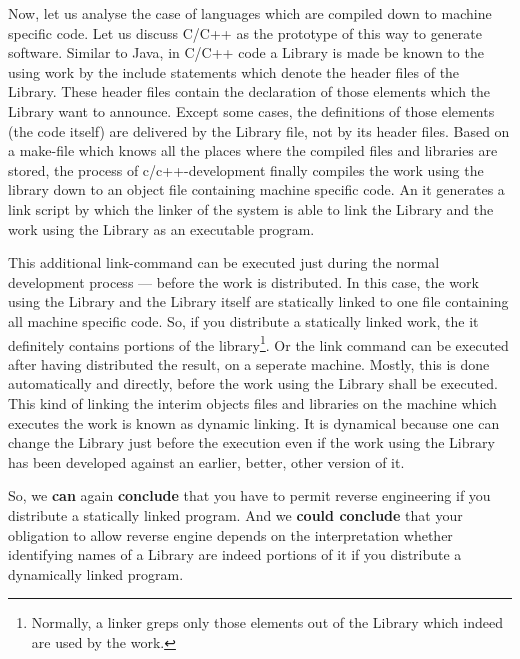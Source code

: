 Now, let us analyse the case of languages which are compiled down to machine
specific code. Let us discuss C/C++ as the prototype of this way to generate
software. Similar to Java, in C/C++ code a Library is made be known to the using
work by the include statements which denote the header files of the Library.
These header files contain the declaration of those elements which the Library
want to announce. Except some cases, the definitions of those elements (the code
itself) are delivered by the Library file, not by its header files. Based on a
make-file which knows all the places where the compiled files and
libraries are stored, the process of c/c++-development finally compiles the work
using the library down to an object file containing machine specific code. An it
generates a link script by which the linker of the system is able to link the
Library and the work using the Library as an executable program.

This additional link-command can be executed just during the normal development
process --- before the work is distributed. In this case, the work using the
Library and the Library itself are statically linked to one file containing all
machine specific code. So, if you distribute a statically linked work, the it
definitely contains portions of the library\footnote{Normally, a linker greps
only those elements out of the Library which indeed are used by the work.}. Or
the link command can be executed after having distributed the result, on a
seperate machine. Mostly, this is done automatically and directly, before the
work using the Library shall be executed. This kind of linking the interim
objects files and libraries on the machine which executes the work is known as
dynamic linking. It is dynamical because one can change the Library just before
the execution even if the work using the Library has been developed against an
earlier, better, other version of it.

So, we \textbf{can} again \textbf{conclude} that you have to permit reverse
engineering if you distribute a statically linked program. And we
\textbf{could conclude} that your obligation to allow reverse engine depends on
the interpretation whether identifying names of a Library are indeed portions of
it if you distribute a dynamically linked program.

